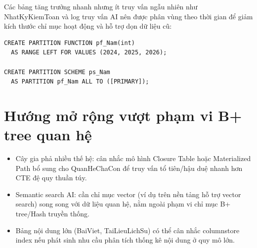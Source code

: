 Các bảng tăng trưởng nhanh nhưng ít truy vấn ngẫu nhiên như NhatKyKiemToan và log truy vấn AI nên được phân vùng theo thời gian để giảm kích thước chỉ mục hoạt động và hỗ trợ dọn dữ liệu cũ:

\begin{sqlcode}
\begin{verbatim}
CREATE PARTITION FUNCTION pf_Nam(int)
  AS RANGE LEFT FOR VALUES (2024, 2025, 2026);

CREATE PARTITION SCHEME ps_Nam
  AS PARTITION pf_Nam ALL TO ([PRIMARY]);
\end{verbatim}
\end{sqlcode}

\section{Hướng mở rộng vượt phạm vi B+ tree quan hệ}

\begin{itemize}
  \item Cây gia phả nhiều thế hệ: cân nhắc mô hình Closure Table hoặc Materialized Path bổ sung cho QuanHeChaCon để truy vấn tổ tiên/hậu duệ nhanh hơn CTE đệ quy thuần túy.
  \item Semantic search AI: cần chỉ mục vector (ví dụ trên nền tảng hỗ trợ vector search) song song với dữ liệu quan hệ, nằm ngoài phạm vi chỉ mục B+ tree/Hash truyền thống.
  \item Bảng nội dung lớn (BaiViet, TaiLieuLichSu) có thể cân nhắc columnstore index nếu phát sinh nhu cầu phân tích thống kê nội dung ở quy mô lớn.
\end{itemize}

